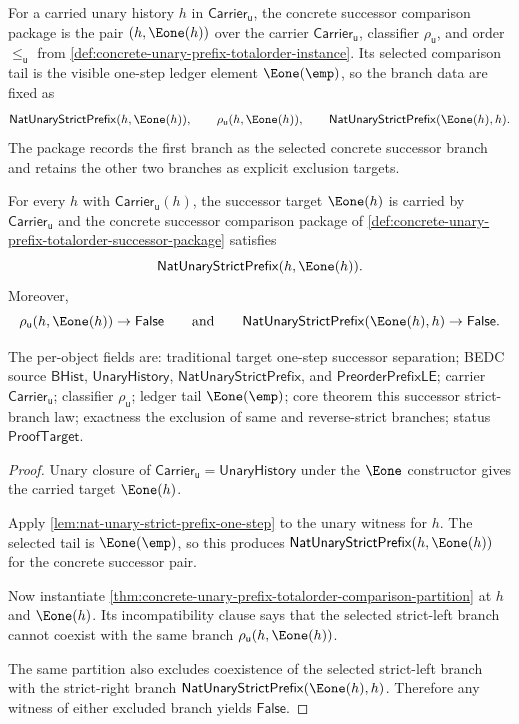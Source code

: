 \begin{definition}
\label{def:concrete-unary-prefix-totalorder-successor-package}
For a carried unary history $h$ in $\mathsf{Carrier}_{\mathsf{u}}$, the concrete
successor comparison package is the pair
$(h,\Eone(h))$ over the carrier $\mathsf{Carrier}_{\mathsf{u}}$, classifier
$\rho_{\mathsf{u}}$, and order $\le_{\mathsf{u}}$ from
\autoref{def:concrete-unary-prefix-totalorder-instance}. Its selected comparison
tail is the visible one-step ledger element $\Eone(\emp)$, so the branch data are
fixed as
$$
\mathsf{NatUnaryStrictPrefix}(h,\Eone(h)),
\qquad
\rho_{\mathsf{u}}(h,\Eone(h)),
\qquad
\mathsf{NatUnaryStrictPrefix}(\Eone(h),h).
$$
The package records the first branch as the selected concrete successor branch
and retains the other two branches as explicit exclusion targets.
\end{definition}

\begin{theorem}
\label{thm:concrete-unary-prefix-totalorder-successor-strict}
For every $h$ with $\mathsf{Carrier}_{\mathsf{u}}(h)$, the successor target
$\Eone(h)$ is carried by $\mathsf{Carrier}_{\mathsf{u}}$ and the concrete
successor comparison package of
\autoref{def:concrete-unary-prefix-totalorder-successor-package} satisfies
$$
\mathsf{NatUnaryStrictPrefix}(h,\Eone(h)).
$$
Moreover,
$$
\rho_{\mathsf{u}}(h,\Eone(h))\to\mathsf{False}
\qquad
\text{and}
\qquad
\mathsf{NatUnaryStrictPrefix}(\Eone(h),h)\to\mathsf{False}.
$$

The per-object fields are: traditional target one-step successor separation; BEDC
source $\mathsf{BHist}$, $\mathsf{UnaryHistory}$,
$\mathsf{NatUnaryStrictPrefix}$, and $\mathsf{PreorderPrefixLE}$; carrier
$\mathsf{Carrier}_{\mathsf{u}}$; classifier $\rho_{\mathsf{u}}$; ledger tail
$\Eone(\emp)$; core theorem this successor strict-branch law; exactness the
exclusion of same and reverse-strict branches; status $\mathsf{ProofTarget}$.
\end{theorem}
\begin{proof}
Unary closure of $\mathsf{Carrier}_{\mathsf{u}}=\mathsf{UnaryHistory}$ under the
$\Eone$ constructor gives the carried target $\Eone(h)$.

Apply \autoref{lem:nat-unary-strict-prefix-one-step} to the unary witness for
$h$. The selected tail is $\Eone(\emp)$, so this produces
$\mathsf{NatUnaryStrictPrefix}(h,\Eone(h))$ for the concrete successor pair.

Now instantiate
\autoref{thm:concrete-unary-prefix-totalorder-comparison-partition} at
$h$ and $\Eone(h)$. Its incompatibility clause says that the selected strict-left
branch cannot coexist with the same branch
$\rho_{\mathsf{u}}(h,\Eone(h))$.

The same partition also excludes coexistence of the selected strict-left branch
with the strict-right branch
$\mathsf{NatUnaryStrictPrefix}(\Eone(h),h)$. Therefore any witness of either
excluded branch yields $\mathsf{False}$.
\end{proof}

